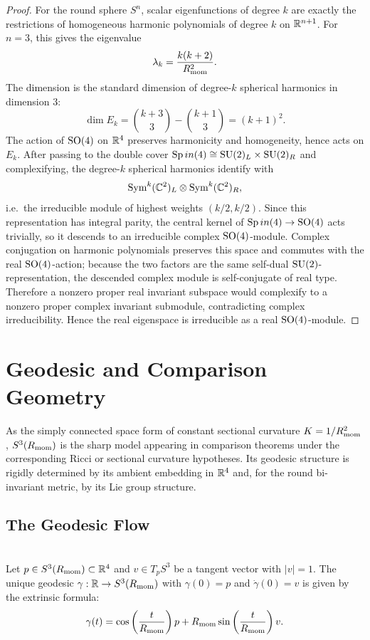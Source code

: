 \documentclass[11pt]{article}
\begin{document}
\begin{proof}
For the round sphere $S^n$, scalar eigenfunctions of degree $k$ are exactly the
restrictions of homogeneous harmonic polynomials of degree $k$ on $\mathbb{R}^{n+1}$.
For $n=3$, this gives the eigenvalue
\[
\lambda_k=\frac{k(k+2)}{R_{\mathrm{mom}}^2}.
\]
The dimension is the standard dimension of degree-$k$ spherical harmonics in
dimension $3$:
\[
\dim E_k
=
\binom{k+3}{3}-\binom{k+1}{3}
=
(k+1)^2.
\]
The action of $\mathrm{SO}(4)$ on $\mathbb{R}^4$ preserves harmonicity and homogeneity, hence
acts on $E_k$. After passing to the double cover
$\operatorname{Sp}in(4)\cong \mathrm{SU}(2)_L\times\mathrm{SU}(2)_R$ and complexifying, the degree-$k$
spherical harmonics identify with
\[
\operatorname{Sym}^k(\mathbb{C}^2)_L\otimes \operatorname{Sym}^k(\mathbb{C}^2)_R,
\]
i.e.\ the irreducible module of highest weights $(k/2,k/2)$. Since this
representation has integral parity, the central kernel of
$\operatorname{Sp}in(4)\to\mathrm{SO}(4)$ acts trivially, so it descends to an irreducible complex
$\mathrm{SO}(4)$-module.  Complex conjugation on harmonic polynomials preserves this
space and commutes with the real \(\mathrm{SO}(4)\)-action; because the two factors are
the same self-dual \(\mathrm{SU}(2)\)-representation, the descended complex module is
self-conjugate of real type.  Therefore a nonzero proper real invariant subspace
would complexify to a nonzero proper complex invariant submodule, contradicting
complex irreducibility. Hence the real eigenspace is irreducible as a real
$\mathrm{SO}(4)$-module.
\end{proof}

\section{Geodesic and Comparison Geometry}
\label{p1:sec:geodesics}

As the simply connected space form of constant sectional curvature $K = 1/R_{\mathrm{mom}}^2$, $S^3(R_{\mathrm{mom}})$ is the sharp model appearing in comparison theorems under the corresponding Ricci or sectional curvature hypotheses. Its geodesic structure is rigidly determined by its ambient embedding in $\mathbb{R}^4$ and, for the round bi-invariant metric, by its Lie group structure.

\subsection{The Geodesic Flow}

\begin{theorem}
\label{p1a:theorem:atlas-explicit-geodesics-9c8c444}

\mbox{}\\[6pt] 
Let $p \in S^3(R_{\mathrm{mom}}) \subset \mathbb{R}^4$ and $v \in T_p S^3$ be a tangent vector with $|v| = 1$. The unique geodesic $\gamma: \mathbb{R} \to S^3(R_{\mathrm{mom}})$ with $\gamma(0) = p$ and $\dot{\gamma}(0) = v$ is given by the extrinsic formula:
\[
\gamma(t) = \cos\left(\frac{t}{R_{\mathrm{mom}}}\right) p + R_{\mathrm{mom}}\sin\left(\frac{t}{R_{\mathrm{mom}}}\right) v.
\]
\cite{do1992riemannian}
\end{theorem}
\end{document}
